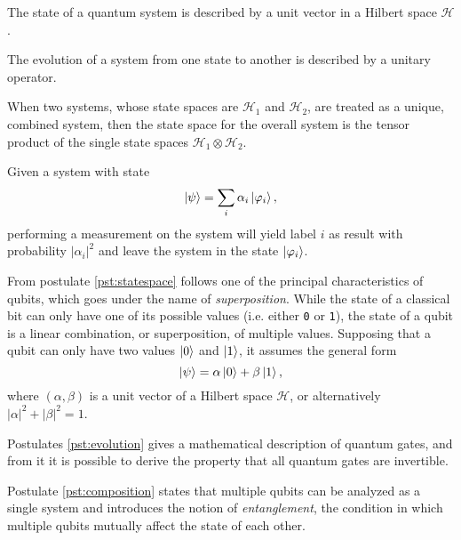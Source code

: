 \begin{postulate}
  \label{pst:statespace}
  The state of a quantum system is described by a unit vector in a Hilbert space $\mathcal{H}$.
\end{postulate}

\begin{postulate}[Evolution]
  \label{pst:evolution}
  The evolution of a system from one state to another is described by a unitary operator.
\end{postulate}

\begin{postulate}
  \label{pst:composition}
  When two systems, whose state spaces are $\mathcal{H}_{1}$ and $\mathcal{H}_{2}$, are treated as a unique, combined system, then the state space for the overall system is the tensor product of the single state spaces $\mathcal{H}_{1} \otimes \mathcal{H}_{2}$.
\end{postulate}

\begin{postulate}[Measurement]
  \label{pst:measurement}
  Given a system with state $$\ket{\psi} = \sum_{i} \alpha_{i} \ket{\varphi_{i}},$$ performing a measurement on the system will yield label $i$ as result with probability $|\alpha_{i}|^{2}$ and leave the system in the state $\ket{\varphi_{i}}$.
\end{postulate}

From postulate \ref{pst:statespace} follows one of the principal characteristics of qubits, which goes under the name of \textit{superposition}. While the state of a classical bit can only have one of its possible values (i.e. either \texttt{0} or \texttt{1}), the state of a qubit is a linear combination, or superposition, of multiple values. Supposing that a qubit can only have two values $\ket{0}$ and $\ket{1}$, it assumes the general form $$\ket{\psi} = \alpha \ket{0} + \beta \ket{1},$$ where $(\alpha, \beta)$ is a unit vector of a Hilbert space $\mathcal{H}$, or alternatively $|\alpha|^{2} + |\beta|^{2} = 1$. %

Postulates \ref{pst:evolution} gives a mathematical description of quantum gates, and from it it is possible to derive the property that all quantum gates are invertible.

Postulate \ref{pst:composition} states that multiple qubits can be analyzed as a single system and introduces the notion of \textit{entanglement}, the condition in which multiple qubits mutually affect the state of each other.

